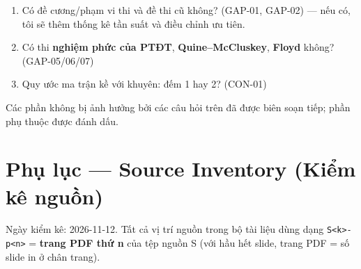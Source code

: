 \documentclass[
  10pt,
  twoside,openany]{book}
\providecommand{\tightlist}{%
  \setlength{\itemsep}{0pt}\setlength{\parskip}{0pt}}
\begin{document}
\begin{enumerate}
\def\labelenumi{\arabic{enumi}.}
\tightlist
\item
  Có đề cương/phạm vi thi và đề thi cũ không? (GAP-01, GAP-02) --- nếu
  có, tôi sẽ thêm thống kê tần suất và điều chỉnh ưu tiên.
\item
  Có thi \textbf{nghiệm phức của PTĐT}, \textbf{Quine--McCluskey},
  \textbf{Floyd} không? (GAP-05/06/07)
\item
  Quy ước ma trận kề với khuyên: đếm 1 hay 2? (CON-01)
\end{enumerate}

Các phần không bị ảnh hưởng bởi các câu hỏi trên đã được biên soạn tiếp;
phần phụ thuộc được đánh dấu.

\hypertarget{phux1ee5-lux1ee5c-source-inventory-kiux1ec3m-kuxea-nguux1ed3n}{%
\chapter{Phụ lục --- Source Inventory (Kiểm kê
nguồn)}\label{phux1ee5-lux1ee5c-source-inventory-kiux1ec3m-kuxea-nguux1ed3n}}

Ngày kiểm kê: 2026-11-12. Tất cả vị trí nguồn trong bộ tài liệu dùng
dạng \texttt{S\textless{}k\textgreater{}-p\textless{}n\textgreater{}} =
\textbf{trang PDF thứ n} của tệp nguồn S (với hầu hết slide, trang PDF =
số slide in ở chân trang).
\end{document}
